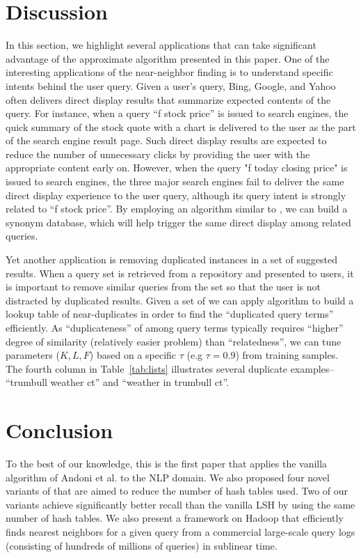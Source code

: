 \section{Discussion}
\label{sec:discuss}
In this section, we highlight several applications that can take significant advantage of the approximate \dflipb algorithm presented in this paper.
One of the interesting applications of the near-neighbor finding is to understand specific intents behind the user query. 
Given a user's query, Bing, Google, and Yahoo often delivers direct display results that summarize expected contents of the query. 
For instance, when a query ``f stock price'' is issued  to search engines, the quick summary of the stock quote with a chart is delivered 
to the user as the part of the search engine result page. 
Such direct display results are expected to reduce the number of unnecessary clicks by providing the user with the appropriate content early on. 
However, when the query "f today closing price" is issued to search engines, the three major search engines 
fail to deliver the same direct display experience to the user query, although its query intent is strongly related to ``f stock price''. 
By employing an algorithm similar to \dflipb, we can build a synonym database, 
which will help trigger the same direct display among related queries.

Yet another application is removing duplicated instances in a set of suggested results. 
When a query set is retrieved from a repository and presented to users, it is important to remove similar queries
from the set so that the user is not distracted by duplicated results. Given a set of
we can apply  \dflipb algorithm to build a lookup table of near-duplicates 
in order to find the ``duplicated query terms'' efficiently. 
As ``duplicateness'' of among query terms typically requires ``higher'' degree of similarity 
(relatively easier problem) than ``relatedness'', 
we can tune parameters ($K, L, F$) based on a specific $\tau$ (e.g $\tau=0.9$) from training samples. 
The fourth column in Table~\ref{tab:lists} illustrates several duplicate examples-- ``trumbull weather ct'' and ``weather in trumbull ct''.

\section{Conclusion}
\label{sec:conclusion}
To the best of our knowledge, this is the first paper that applies
the vanilla \lsh algorithm of Andoni et al. to the NLP domain. 
We also proposed four novel variants of \lsh that are aimed to reduce the number 
of hash tables used. Two of our variants achieve 
significantly better recall than the vanilla LSH by using the same number of hash tables. 
We also present a framework on Hadoop that efficiently finds nearest neighbors for a given query from a commercial 
large-scale query logs (consisting of hundreds of millions of queries) in sublinear time.

